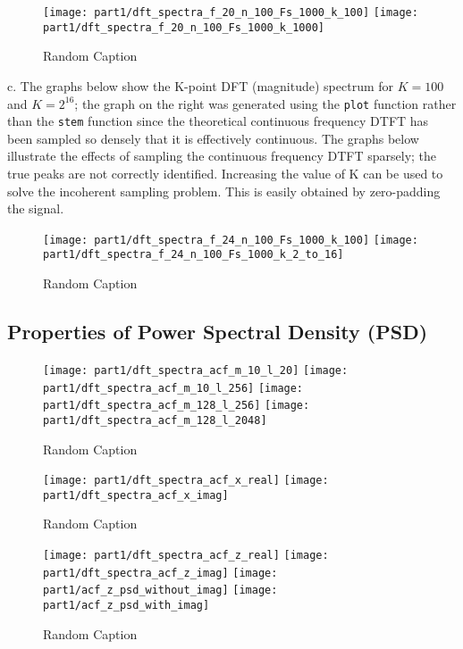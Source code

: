 \begin{figure}[H]
\centering{}
\texttt{[image: part1/dft\_spectra\_f\_20\_n\_100\_Fs\_1000\_k\_100]}
\texttt{[image: part1/dft\_spectra\_f\_20\_n\_100\_Fs\_1000\_k\_1000]}
\label{fig:dft_spectra_f_20}
\caption{Random Caption}
\end{figure}

\noindent{}c. The graphs below show the K-point DFT (magnitude) spectrum for $K=100$ and $K=2^{16}$; the graph on the right was generated using the \texttt{plot} function rather than the \texttt{stem} function since the theoretical continuous frequency DTFT has been sampled so densely that it is effectively continuous. The graphs below illustrate the effects of sampling the continuous frequency DTFT sparsely; the true peaks are not correctly identified. Increasing the value of K can be used to solve the incoherent sampling problem. This is easily obtained by zero-padding the signal.

\begin{figure}[H]
\centering{}
\texttt{[image: part1/dft\_spectra\_f\_24\_n\_100\_Fs\_1000\_k\_100]}
\texttt{[image: part1/dft\_spectra\_f\_24\_n\_100\_Fs\_1000\_k\_2\_to\_16]}
\caption{Random Caption}
\end{figure}

\subsection{Properties of Power Spectral Density (PSD)}

\begin{figure}[H]
\centering{}
\texttt{[image: part1/dft\_spectra\_acf\_m\_10\_l\_20]}
\texttt{[image: part1/dft\_spectra\_acf\_m\_10\_l\_256]}
\texttt{[image: part1/dft\_spectra\_acf\_m\_128\_l\_256]}
\texttt{[image: part1/dft\_spectra\_acf\_m\_128\_l\_2048]}
\caption{Random Caption}
\end{figure}


\begin{figure}[H]
\centering{}
\texttt{[image: part1/dft\_spectra\_acf\_x\_real]}
\texttt{[image: part1/dft\_spectra\_acf\_x\_imag]}
\caption{Random Caption}
\end{figure}


\begin{figure}[H]
\centering{}
\texttt{[image: part1/dft\_spectra\_acf\_z\_real]}
\texttt{[image: part1/dft\_spectra\_acf\_z\_imag]}
\texttt{[image: part1/acf\_z\_psd\_without\_imag]}
\texttt{[image: part1/acf\_z\_psd\_with\_imag]}
\caption{Random Caption}
\end{figure}

